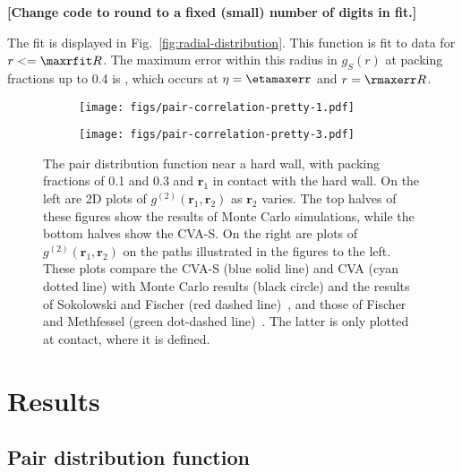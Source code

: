\documentclass[letterpaper,twocolumn,amsmath,amssymb,pre,aps,10pt]{revtex4-1}
\newcommand{\red}[1]{{\bf \color{red} #1}}
\newcommand{\rr}{\textbf{r}}
\newcommand{\fixme}[1]{\red{[#1]}}
\begin{document}
\fixme{Change code to round to a fixed (small) number of digits in fit.}

The fit is displayed in Fig.~\ref{fig:radial-distribution}.  This
function is fit to data for $r <= \maxrfit R$.  The maximum error
within this radius in $g_S(r)$ at packing fractions up to 0.4 is
\maxerr, which occurs at $\eta = \etamaxerr$ and $r = \rmaxerr R$.

\newcommand{\plotcomp}[1]{The top halves of these figures show the
  results of Monte Carlo simulations, while the bottom halves show the
  CVA-S.  On the right are plots of #1 on the paths illustrated in the
  figures to the left.  These plots compare the CVA-S (blue solid line) and CVA
  (cyan dotted line) with Monte Carlo results (black circle)
  and the results of Sokolowski and Fischer
  (red dashed line)~\cite{sokolowski1992role}, and those of Fischer and Methfessel
  (green dot-dashed line)~\cite{fischer1980born}.  The latter is only plotted at
  contact, where it is defined}

\begin{figure*}
  \begin{subfigure}{\textwidth}
    \texttt{[image: figs/pair-correlation-pretty-1.pdf]}
    \vspace{-0.6cm}
  \end{subfigure}
  \begin{subfigure}{\textwidth}
    \texttt{[image: figs/pair-correlation-pretty-3.pdf]}
    \vspace{-0.6cm}
  \end{subfigure}
  \caption{The pair distribution function near a hard wall, with
    packing fractions of 0.1 and 0.3 and $\rr_1$ in contact with the
    hard wall.  On the left are 2D plots of $g^{(2)}(\rr_1,\rr_2)$ as
    $\rr_2$ varies. \plotcomp{$g^{(2)}(\rr_1,\rr_2)$}.}
  \label{fig:pair-distribution}
\end{figure*}

\section{Results}

\subsection{Pair distribution function}

\end{document}
